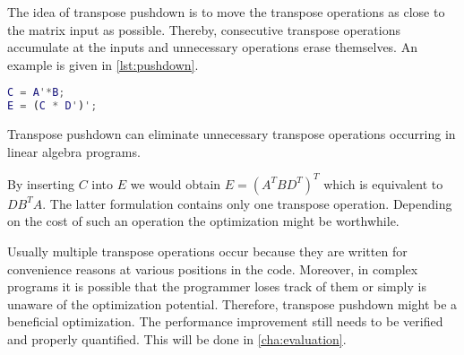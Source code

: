 The idea of transpose pushdown is to move the transpose operations as close to the matrix input as possible.
Thereby, consecutive transpose operations accumulate at the inputs and unnecessary operations erase themselves.
An example is given in \cref{lst:pushdown}.

\begin{listing}[!h]
	\begin{CenteredBox}
		\begin{lstlisting}[language=Matlab]
C = A'*B;
E = (C * D')';
		\end{lstlisting}
	\end{CenteredBox}
	\caption{Transpose pushdown can eliminate unnecessary transpose operations occurring in linear algebra programs.}
	\label{lst:pushdown}
\end{listing}

By inserting $C$ into $E$ we would obtain $E=(A^T BD^T)^T$ which is equivalent to $DB^T A$.
The latter formulation contains only one transpose operation.
Depending on the cost of such an operation the optimization might be worthwhile.

Usually multiple transpose operations occur because they are written for convenience reasons at various positions in the code.
Moreover, in complex programs it is possible that the programmer loses track of them or simply is unaware of the optimization potential.
Therefore, transpose pushdown might be a beneficial optimization.
The performance improvement still needs to be verified and properly quantified.
This will be done in \cref{cha:evaluation}.